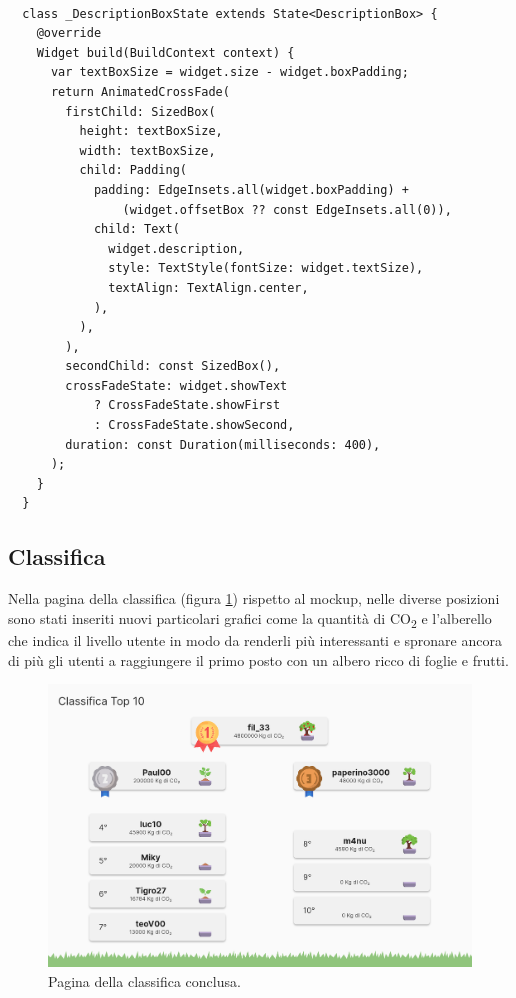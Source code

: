 %
\begin{lstlisting}[style=FlutterStyle, caption={Stato della classe DescriptionBox che genera il widget della descrizione del contatore}, label={lst:descrBoxStat}]

  class _DescriptionBoxState extends State<DescriptionBox> {
    @override
    Widget build(BuildContext context) {
      var textBoxSize = widget.size - widget.boxPadding;
      return AnimatedCrossFade(
        firstChild: SizedBox(
          height: textBoxSize,
          width: textBoxSize,
          child: Padding(
            padding: EdgeInsets.all(widget.boxPadding) +
                (widget.offsetBox ?? const EdgeInsets.all(0)),
            child: Text(
              widget.description,
              style: TextStyle(fontSize: widget.textSize),
              textAlign: TextAlign.center,
            ),
          ),
        ),
        secondChild: const SizedBox(),
        crossFadeState: widget.showText
            ? CrossFadeState.showFirst
            : CrossFadeState.showSecond,
        duration: const Duration(milliseconds: 400),
      );
    }
  }
\end{lstlisting}
%
%
\subsection{Classifica}
Nella pagina della classifica (figura \ref{fig:top10screen}) rispetto al mockup, nelle diverse posizioni sono stati inseriti nuovi particolari grafici come la quantità di CO\textsubscript{2} e l'alberello che indica il livello utente in modo da renderli più interessanti e spronare ancora di più gli utenti a raggiungere il primo posto con un albero ricco di foglie e frutti.
\begin{figure}[h!]
  \centering
  \includegraphics[width=\textwidth]{img/totem/screenshot/top10screen.png}
  \caption{Pagina della classifica conclusa.}
  \label{fig:top10screen}
\end{figure}
%
%
